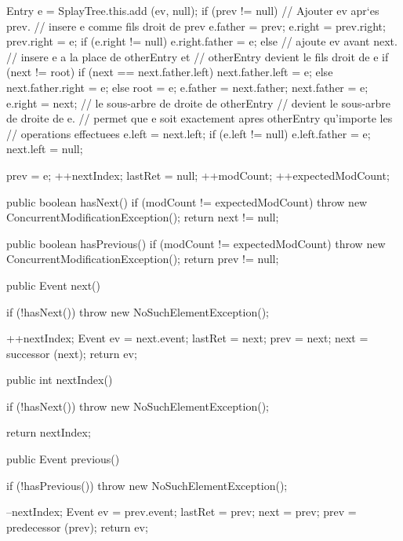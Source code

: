 \begin{hide}
\begin{code}
\begin{hide}
{{         Entry e = SplayTree.this.add (ev, null);
         if (prev != null) {
            // Ajouter ev apr`es prev.
            // insere e comme fils droit de prev
            e.father = prev;
            e.right = prev.right;
            prev.right = e;
            if (e.right != null)
               e.right.father = e;
         }
         else {
            // ajoute ev avant next.
            // insere e a la place de otherEntry et
            // otherEntry devient le fils droit de e
            if (next != root) {
               if (next == next.father.left)
                  next.father.left = e;
               else
                  next.father.right = e;
            }
            else
               root = e;
            e.father = next.father;
            next.father = e;
            e.right = next;
            // le sous-arbre de droite de otherEntry
            // devient le sous-arbre de droite de e.
            // permet que e soit exactement apres otherEntry qu'importe les
            // operations effectuees
            e.left = next.left;
            if (e.left != null)
               e.left.father = e;
            next.left = null;
         }

         prev = e;
         ++nextIndex;
         lastRet = null;
         ++modCount;
         ++expectedModCount;
      }

      public boolean hasNext() {
         if (modCount != expectedModCount)
            throw new ConcurrentModificationException();
         return next != null;
      }

      public boolean hasPrevious() {
         if (modCount != expectedModCount)
            throw new ConcurrentModificationException();
         return prev != null;
      }

      public Event next() {
         if (!hasNext())
            throw new NoSuchElementException();

         ++nextIndex;
         Event ev = next.event;
         lastRet = next;
         prev = next;
         next = successor (next);
         return ev;
      }

      public int nextIndex() {
         if (!hasNext())
            throw new NoSuchElementException();

         return nextIndex;
      }

      public Event previous() {
         if (!hasPrevious())
            throw new NoSuchElementException();

         --nextIndex;
         Event ev = prev.event;
         lastRet = prev;
         next = prev;
         prev = predecessor (prev);
         return ev;
      }

}
\end{hide}
\end{code}
\end{hide}
